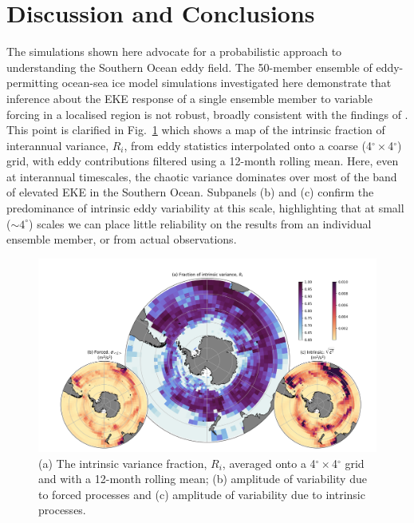 \documentclass[linenumbers]{agujournal2019}
\begin{document}
\section{Discussion and Conclusions}
The simulations shown here advocate for a probabilistic approach to understanding the Southern Ocean eddy field.
The 50-member ensemble of eddy-permitting ocean-sea ice model simulations investigated here demonstrate that inference about the EKE response of a single ensemble member to variable forcing in a localised region is not robust, broadly consistent with the findings of \citet{Zhang2021}.
This point is clarified in Fig.~\ref{Fig:6} which shows a map of the intrinsic fraction of interannual variance, $R_i$, from eddy statistics interpolated onto a coarse (4$^\circ \times$4$^\circ$) grid, with eddy contributions filtered using a 12-month rolling mean.
Here, even at interannual timescales, the chaotic variance dominates over most of the band of elevated EKE in the Southern Ocean. 
Subpanels (b) and (c) confirm the predominance of intrinsic eddy variability at this scale, highlighting that at small ($\sim 4^\circ$) scales we can place little reliability on the results from an individual ensemble member, or from actual observations.

\begin{figure}[t]
\begin{center}
\includegraphics[width=\hsize]{Figure7}
\caption{(a) The intrinsic variance fraction, $R_i$, averaged onto a  4$^\circ \times$4$^\circ$ grid and with a 12-month rolling mean; (b) amplitude of variability due to forced processes and (c) amplitude of variability due to intrinsic processes. }
\label{Fig:6}
\end{center}
\end{figure}
\end{document}
